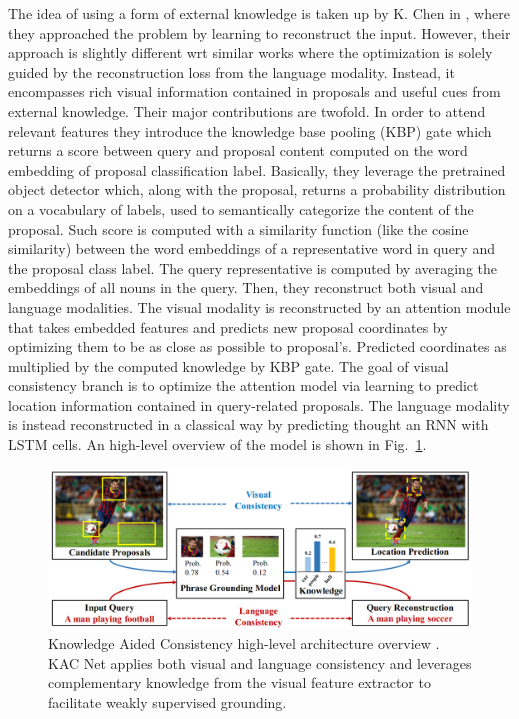 The idea of using a form of external knowledge is taken up by K. Chen
\etal{} in \cite{chen2018knowledge}, where they approached the problem
by learning to reconstruct the input. However, their approach is
slightly different wrt similar works where the optimization is solely
guided by the reconstruction loss from the language modality. Instead,
it encompasses rich visual information contained in proposals and
useful cues from external knowledge. Their major contributions are
twofold. In order to attend relevant features they introduce the
knowledge base pooling (KBP) gate which returns a score between query
and proposal content computed on the word embedding of proposal
classification label. Basically, they leverage the pretrained object
detector which, along with the proposal, returns a probability
distribution on a vocabulary of labels, used to semantically
categorize the content of the proposal. Such score is computed with a
similarity function (like the cosine similarity) between the word
embeddings of a representative word in query and the proposal class
label. The query representative is computed by averaging the
embeddings of all nouns in the query. Then, they reconstruct both
visual and language modalities. The visual modality is reconstructed
by an attention module that takes embedded features and predicts new
proposal coordinates by optimizing them to be as close as possible to
proposal's. Predicted coordinates as multiplied by the computed
knowledge by KBP gate. The goal of visual consistency branch is to
optimize the attention model via learning to predict location
information contained in query-related proposals. The language
modality is instead reconstructed in a classical way by predicting
thought an RNN with LSTM cells. An high-level overview of the model is
shown in Fig.~\ref{fig:kac-example}.

\begin{figure}
  \centering
  \includegraphics[width=.8\textwidth]{figures/kac-example.png}
  \caption[Knowledge Aided Consistency high-level architecture
  overview]{Knowledge Aided Consistency high-level architecture
  overview \cite{chen2018knowledge}. KAC Net applies both visual and
  language consistency and leverages complementary knowledge from
  the visual feature extractor to facilitate weakly supervised
  grounding.}
  \label{fig:kac-example}
\end{figure}

